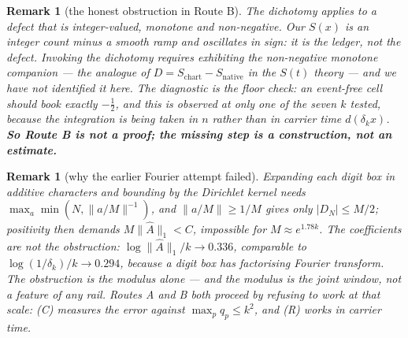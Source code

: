 \documentclass[11pt]{article}
\newtheorem{remark}[theorem]{Remark}
\begin{document}
\begin{remark}[the honest obstruction in Route B]\label{rem:defectform}
The dichotomy applies to a defect that is \emph{integer-valued, monotone and non-negative}.
Our $S(x)$ is an integer count minus a smooth ramp and oscillates in sign: it is the
\emph{ledger}, not the defect.  Invoking the dichotomy requires exhibiting the non-negative
monotone companion --- the analogue of $D=S_{\mathrm{chart}}-S_{\mathrm{native}}$ in the
$S(t)$ theory --- and we have not identified it here.  The diagnostic is the floor check:
an event-free cell should book exactly $-\tfrac12$, and this is observed at only one of the
seven $k$ tested, because the integration is being taken in $n$ rather than in carrier time
$d(\delta_kx)$.  \textbf{So Route B is not a proof; the missing step is a construction, not
an estimate.}
\end{remark}

\begin{remark}[why the earlier Fourier attempt failed]
Expanding each digit box in additive characters and bounding by the Dirichlet kernel needs
$\max_a\min(N,\|a/M\|^{-1})$, and $\|a/M\|\ge1/M$ gives only $|D_N|\le M/2$; positivity then
demands $M\|\widehat{A}\|_1<C$, impossible for $M\approx e^{1.78k}$.  The coefficients are
\emph{not} the obstruction: $\log\|\widehat A\|_1/k\to0.336$, comparable to
$\log(1/\delta_k)/k\to0.294$, because a digit box has factorising Fourier transform.  The
obstruction is the modulus alone --- and the modulus is the joint window, not a feature of
any rail.  Routes A and B both proceed by refusing to work at that scale: (C) measures the
error against $\max_pq_p\le k^{2}$, and (R) works in carrier time.
\end{remark}
\end{document}
